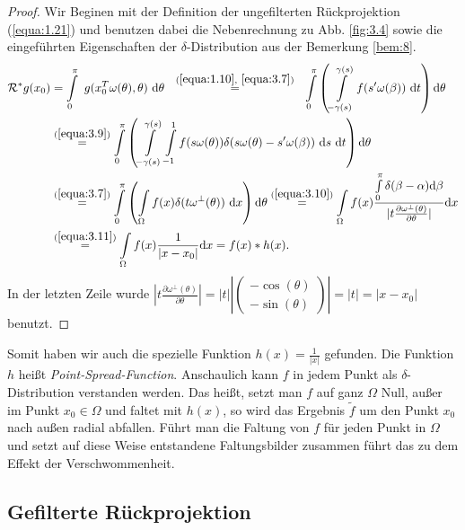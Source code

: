 \begin{proof}
	Wir Beginen mit der Definition der ungefilterten Rückprojektion (\ref{equa:1.21}) und benutzen dabei die Nebenrechnung zu Abb. \ref{fig:3.4} sowie die eingeführten Eigenschaften der $\delta$-Distribution aus der Bemerkung \ref{bem:8}.
	\begin{equation}
	\begin{split}
		\mathcal{R^*} g(x_0) & = \int\limits_{0}^{\pi} \ g(x_{0}^{T}\omega(\theta),\theta) \ \mbox{d}\theta  \ \  \stackrel{(\ref{equa:1.10}, \ \ref{equa:3.7})}{=} \ \ \int\limits_{0}^{\pi} \left( \int\limits_{-\gamma(s)}^{\gamma(s)} f(s'\omega(\beta)) \ \mbox{d}t \right) \mbox{d}\theta \\
		& \stackrel{(\ref{equa:3.9})}{=} \int\limits_{0}^{\pi} \left( \int\limits_{-\gamma(s)}^{\gamma(s)} \int\limits_{-1}^{1} f(s\omega(\theta)) \delta(s\omega(\theta) - s'\omega(\beta)) \ \mbox{d}s \ \mbox{d}t \right) \mbox{d}\theta \\
		& \stackrel{(\ref{equa:3.7})}{=} \int\limits_{0}^{\pi} \left( \int\limits_{\Omega} f(x) \delta(t\omega^{\perp}(\theta)) \ \mbox{d}x \right) \mbox{d}\theta \stackrel{(\ref{equa:3.10})}{=} \int\limits_{\Omega} f(x) \frac{\int\limits_{0}^{\pi}\delta(\beta - \alpha)\mbox{d}\beta}{|t\frac{\partial \omega^{\perp}(\theta)}{\partial \theta}|} \mbox{d}x \\
		& \stackrel{(\ref{equa:3.11})}{=} \int\limits_{\Omega} f(x) \frac{1}{|x - x_0|} \mbox{d}x = f(x)*h(x).
	\end{split}
	\label{equa:3.12}
	\end{equation}
	In der letzten Zeile wurde $|t\frac{\partial \omega^{\perp}(\theta)}{\partial \theta}| = |t||\left(\begin{array}{c} -\cos(\theta) \\ -\sin(\theta) \end{array}\right)| = |t| = |x -x_0|$ benutzt.
\end{proof}
Somit haben wir auch die spezielle Funktion $h(x) = \frac{1}{|x|}$ gefunden. Die Funktion $h$ heißt \textit{Point-Spread-Function}. Anschaulich kann $f$ in jedem Punkt als $\delta$-Distribution verstanden werden. Das heißt, setzt man $f$ auf ganz $\Omega$ Null, außer im Punkt $x_0 \in \Omega$ und faltet mit $h(x)$, so wird das Ergebnis $\tilde{f}$ um den Punkt $x_0$ nach außen radial abfallen. Führt man die Faltung von $f$ für jeden Punkt in $\Omega$ und setzt auf diese Weise entstandene Faltungsbilder zusammen führt das zu dem Effekt der Verschwommenheit. 

\subsection{Gefilterte Rückprojektion}
\label{cha:3.1.2}

